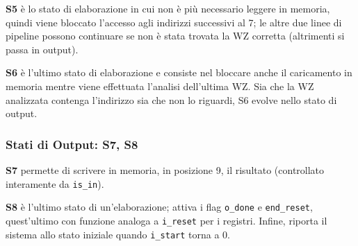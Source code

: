 \textbf{S5} \`e lo stato di elaborazione in cui non \`e pi\`u necessario leggere in memoria, quindi viene bloccato l'accesso agli indirizzi successivi al 7; le altre due linee di pipeline possono continuare se non \`e stata trovata la WZ corretta (altrimenti si passa in output).

\textbf{S6} \`e l'ultimo stato di elaborazione e consiste nel bloccare anche il caricamento in memoria mentre viene effettuata l'analisi dell'ultima WZ. Sia che la WZ analizzata contenga l'indirizzo sia che non lo riguardi, S6 evolve nello stato di output.

\subsubsection{Stati di Output: S7, S8}
\textbf{S7} permette di scrivere in memoria, in posizione 9, il risultato (controllato interamente da \texttt{is\_in}).

\textbf{S8} \`e l'ultimo stato di un'elaborazione; attiva i flag \texttt{o\_done} e \texttt{end\_reset}, quest'ultimo con funzione analoga a \texttt{i\_reset} per i registri. Infine, riporta il sistema allo stato iniziale quando \texttt{i\_start} torna a 0.

